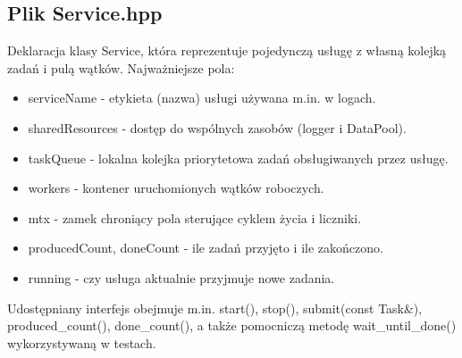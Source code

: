 \documentclass[a4paper,12pt]{article}
\begin{document}
        \subsection{Plik Service.hpp}
            \vspace{-0.2em}
            Deklaracja klasy Service, która reprezentuje pojedynczą usługę z własną kolejką zadań i pulą wątków. Najważniejsze pola:
            \begin{itemize}
                \item serviceName - etykieta (nazwa) usługi używana m.in. w logach.
                \item sharedResources - dostęp do wspólnych zasobów (logger i DataPool).
                \item taskQueue - lokalna kolejka priorytetowa zadań obsługiwanych przez usługę.
                \item workers - kontener uruchomionych wątków roboczych.
                \item mtx - zamek chroniący pola sterujące cyklem życia i liczniki.
                \item producedCount, doneCount - ile zadań przyjęto i ile zakończono.
                \item running - czy usługa aktualnie przyjmuje nowe zadania.
            \end{itemize}
            Udostępniany interfejs obejmuje m.in. start(), stop(), submit(const Task\&), produced\_count(), done\_count(), a także pomocniczą metodę wait\_until\_done() wykorzystywaną w testach.
            \newpage
            \vspace*{2em}
\end{document}

